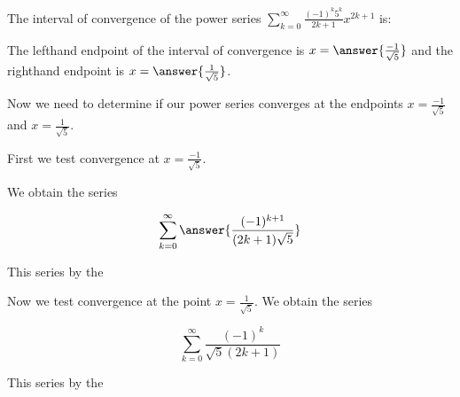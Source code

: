 \documentclass{ximera}
\begin{document}
\begin{exercise}
\begin{exercise}
\begin{exercise}
\begin{hint}
\end{hint}








\begin{exercise}
The interval of convergence of the power series $\sum_{k=0}^{\infty} \frac{(-1)^k 5^k }{2k+1}x^{2k+1}$ is:
\begin{multipleChoice}
\choice{$\left(-\frac{1}{\sqrt{5}},\frac{1}{\sqrt{5}}\right]$}
\choice{$\left[-\frac{1}{\sqrt{5}},\frac{1}{\sqrt{5}}\right)$}
\end{multipleChoice}


\begin{hint}

The lefthand endpoint of the interval of convergence is $x=\answer{\frac{-1}{\sqrt{5}}}$ and the righthand endpoint is $x= \answer{\frac{1}{\sqrt{5}}}$.

 Now we need to determine if our power series converges at the endpoints $x=\frac{-1}{\sqrt{5}}$ and $x=\frac{1}{\sqrt{5}}$. 

First we test convergence at $x=\frac{-1}{\sqrt{5}}$. 

We obtain the series

\[
\sum^{\infty}_{k=0} \answer{\frac{(-1)^{k+1}}{(2k+1)\sqrt{5}}}
\]


This series  by the 

\begin{multipleChoice}
\end{multipleChoice}


Now we test convergence at the point  $x=\frac{1}{\sqrt{5}}$. We obtain the series

\[
\sum^{\infty}_{k=0} \frac{(-1)^k}{\sqrt{5}(2k+1)}
\]


This series  by the 

\begin{multipleChoice}
\end{multipleChoice}

\end{hint}




\end{exercise}
\end{exercise}
\end{exercise}
\end{exercise}
\end{document}
